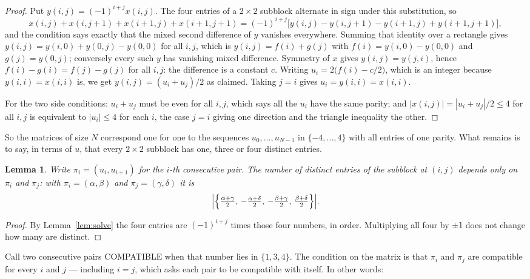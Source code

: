 \documentclass[11pt,a4paper]{article}
\theoremstyle{plain}
\newtheorem{lemma}[theorem]{Lemma}
\theoremstyle{definition}
\begin{document}
\begin{proof}
Put $y(i,j)=(-1)^{i+j}x(i,j)$. The four entries of a $2\times2$ subblock alternate in sign
under this substitution, so
\[
x(i,j)+x(i,j{+}1)+x(i{+}1,j)+x(i{+}1,j{+}1)
=(-1)^{i+j}\bigl[y(i,j)-y(i,j{+}1)-y(i{+}1,j)+y(i{+}1,j{+}1)\bigr],
\]
and the condition says exactly that the mixed second difference of $y$ vanishes everywhere.
Summing that identity over a rectangle gives
$y(i,j)=y(i,0)+y(0,j)-y(0,0)$ for all $i,j$, which is $y(i,j)=f(i)+g(j)$ with
$f(i)=y(i,0)-y(0,0)$ and $g(j)=y(0,j)$; conversely every such $y$ has vanishing mixed
difference. Symmetry of $x$ gives $y(i,j)=y(j,i)$, hence $f(i)-g(i)=f(j)-g(j)$ for all $i,j$:
the difference is a constant $c$. Writing $u_i=2\bigl(f(i)-c/2\bigr)$, which is an integer
because $y(i,i)=x(i,i)$ is, we get $y(i,j)=(u_i+u_j)/2$ as claimed. Taking $j=i$ gives
$u_i=y(i,i)=x(i,i)$.

For the two side conditions: $u_i+u_j$ must be even for all $i,j$, which says all the $u_i$ have
the same parity; and $|x(i,j)|=|u_i+u_j|/2\le4$ for all $i,j$ is equivalent to $|u_i|\le4$
for each $i$, the case $j=i$ giving one direction and the triangle inequality the other.
\end{proof}

So the matrices of size $N$ correspond one for one to the sequences $u_0,\dots,u_{N-1}$ in
$\{-4,\dots,4\}$ with all entries of one parity. What remains is to say, in terms of $u$,
that every $2\times2$ subblock has one, three or four distinct entries.

\begin{lemma}\label{lem:block}
Write $\pi_i=(u_i,u_{i+1})$ for the $i$-th consecutive pair. The number of distinct entries of
the subblock at $(i,j)$ depends only on $\pi_i$ and $\pi_j$: with $\pi_i=(\alpha,\beta)$ and
$\pi_j=(\gamma,\delta)$ it is
\[
\Bigl|\Bigl\{\tfrac{\alpha+\gamma}{2},\,-\tfrac{\alpha+\delta}{2},\,
-\tfrac{\beta+\gamma}{2},\,\tfrac{\beta+\delta}{2}\Bigr\}\Bigr| .
\]
\end{lemma}

\begin{proof}
By Lemma~\ref{lem:solve} the four entries are $(-1)^{i+j}$ times those four numbers, in
order. Multiplying all four by $\pm1$ does not change how many are distinct.
\end{proof}

Call two consecutive pairs COMPATIBLE when that number lies in $\{1,3,4\}$. The condition on the
matrix is that $\pi_i$ and $\pi_j$ are compatible for every $i$ and $j$ --- including $i=j$,
which asks each pair to be compatible with itself. In other words:
\end{document}
